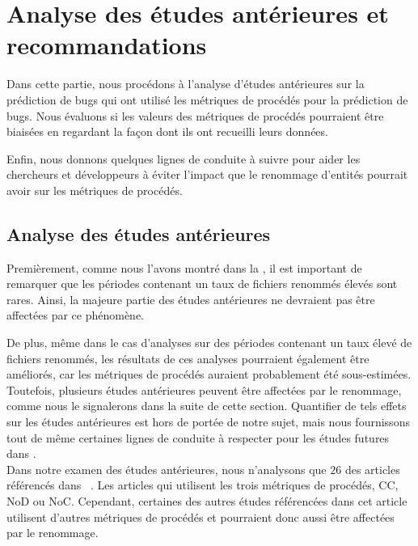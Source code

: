 \section{Analyse des études antérieures et recommandations}
\label{sec:analyse}

Dans cette partie, nous procédons à l’analyse d’études antérieures sur la prédiction de bugs qui ont utilisé les métriques de procédés pour la prédiction de bugs. Nous évaluons si les valeurs des métriques de procédés pourraient être biaisées en regardant la façon dont ils ont recueilli leurs données.

Enfin, nous donnons quelques lignes de conduite à suivre pour aider les chercheurs et développeurs à éviter l’impact que le renommage d’entités pourrait avoir sur les métriques de procédés.  

\subsection{Analyse des études antérieures}

Premièrement, comme nous l'avons montré dans la , il est important de remarquer que les périodes contenant un taux de fichiers renommés élevés sont rares. Ainsi, la majeure partie des études antérieures ne devraient pas être affectées par ce phénomène. 

De plus, même dans le cas d'analyses sur des périodes contenant un taux élevé de fichiers renommés, les résultats de ces analyses pourraient également être améliorés, car les métriques de procédés auraient probablement été sous-estimées. Toutefois, plusieurs études antérieures peuvent être affectées par le renommage, comme nous le signalerons dans la suite de cette section. Quantifier de tels effets sur les études antérieures est hors de portée de notre sujet, mais nous fournissons tout de même certaines lignes de conduite à respecter pour les études futures dans .\\

Dans notre examen des études antérieures, nous n'analysons que $26$ des articles référencés dans ~\cite{radjenovic_software_2013}. Les articles qui utilisent les trois métriques de procédés, CC, NoD ou NoC. Cependant, certaines des autres études référencées dans cet article utilisent d'autres métriques de procédés et pourraient donc aussi être affectées par le renommage.\\

